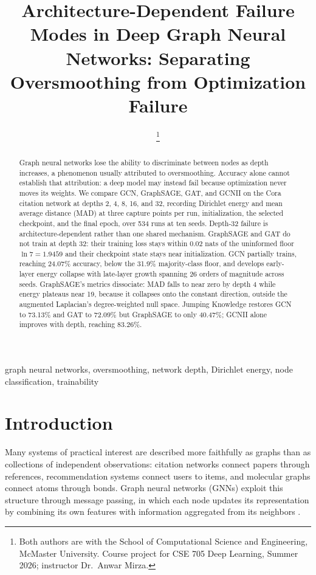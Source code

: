 \documentclass[
  conference]{IEEEtran}
\author{%
\IEEEauthorblockN{Kiarash Ara}
\IEEEauthorblockA{arak@mcmaster.ca}
\and
\IEEEauthorblockN{Yiheng Wu}
\IEEEauthorblockA{wu1261@mcmaster.ca}%
\thanks{Both authors are with the School of Computational Science and
Engineering, McMaster University. Course project for CSE 705 Deep Learning,
Summer 2026; instructor Dr.~Anwar Mirza.}%
}%
\title{Architecture-Dependent Failure Modes in Deep Graph Neural
Networks: Separating Oversmoothing from Optimization Failure}
\author{}
\date{}
\begin{document}
\maketitle
\begin{abstract}
Graph neural networks lose the ability to discriminate between nodes as
depth increases, a phenomenon usually attributed to oversmoothing.
Accuracy alone cannot establish that attribution: a deep model may
instead fail because optimization never moves its weights. We compare
GCN, GraphSAGE, GAT, and GCNII on the Cora citation network at depths 2,
4, 8, 16, and 32, recording Dirichlet energy and mean average distance
(MAD) at three capture points per run, initialization, the selected
checkpoint, and the final epoch, over 534 runs at ten seeds. Depth-32
failure is architecture-dependent rather than one shared mechanism.
GraphSAGE and GAT do not train at depth 32: their training loss stays
within 0.02 nats of the uninformed floor \(\ln 7 = 1.9459\) and their
checkpoint state stays near initialization. GCN partially trains,
reaching 24.07\% accuracy, below the 31.9\% majority-class floor, and
develops early-layer energy collapse with late-layer growth spanning 26
orders of magnitude across seeds. GraphSAGE's metrics dissociate: MAD
falls to near zero by depth 4 while energy plateaus near 19, because it
collapses onto the constant direction, outside the augmented Laplacian's
degree-weighted null space. Jumping Knowledge restores GCN to 73.13\%
and GAT to 72.09\% but GraphSAGE to only 40.47\%; GCNII alone improves
with depth, reaching 83.26\%.
\end{abstract}


\begin{IEEEkeywords}
graph neural networks, oversmoothing, network depth, Dirichlet energy,
node classification, trainability
\end{IEEEkeywords}

\section{Introduction}\label{introduction}

Many systems of practical interest are described more faithfully as
graphs than as collections of independent observations: citation
networks connect papers through references, recommendation systems
connect users to items, and molecular graphs connect atoms through
bonds. Graph neural networks (GNNs) exploit this structure through
message passing, in which each node updates its representation by
combining its own features with information aggregated from its
neighbors \citep{gilmer2017neural}.
\end{document}
